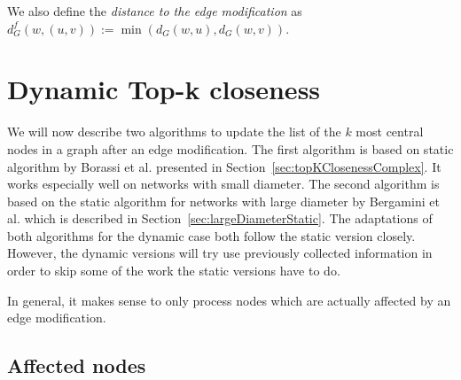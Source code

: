 We also define the \emph{distance to the edge modification} as $d_G^f(w, (u, v)) := \min{(d_G(w, u), d_G(w, v))}$.


\section{Dynamic Top-k closeness}
We will now describe two algorithms to update the list of the $k$ most central nodes in a graph after an edge modification. The first algorithm is based on static algorithm by Borassi et al. presented in Section~\ref{sec:topKClosenessComplex}. It works especially well on networks with small diameter. The second algorithm is based on the static algorithm for networks with large diameter by Bergamini et al. which is described in Section~\ref{sec:largeDiameterStatic}. The adaptations of both algorithms for the dynamic case both follow the static version closely. However, the dynamic versions will try use previously collected information in order to skip some of the work the static versions have to do.

In general, it makes sense to only process nodes which are actually affected by an edge modification. 

\subsection{Affected nodes}

